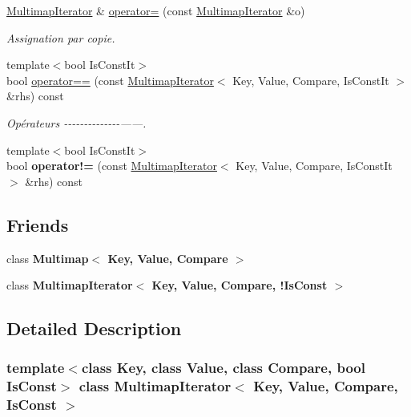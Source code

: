 \begin{DoxyCompactItemize}
\hyperlink{classMultimapIterator}{Multimap\+Iterator} \& \hyperlink{classMultimapIterator_af337db177c534cb9b9ffed2f43880e6a}{operator=} (const \hyperlink{classMultimapIterator}{Multimap\+Iterator} \&o)
\begin{DoxyCompactList}\small\item\em Assignation par copie. \end{DoxyCompactList}\item 
{\footnotesize template$<$bool Is\+Const\+It$>$ }\\bool \hyperlink{classMultimapIterator_ad8ae7f78f86f880a611c9bc4939ec98b}{operator==} (const \hyperlink{classMultimapIterator}{Multimap\+Iterator}$<$ Key, Value, Compare, Is\+Const\+It $>$ \&rhs) const
\begin{DoxyCompactList}\small\item\em Opérateurs -\/-\/-\/-\/-\/-\/-\/-\/-\/-\/-\/-\/-\/-\/------. \end{DoxyCompactList}\item 
\mbox{\label{classMultimapIterator_a22772d2fe41f4cd132c2a882372473e3}} 
{\footnotesize template$<$bool Is\+Const\+It$>$ }\\bool {\bfseries operator!=} (const \hyperlink{classMultimapIterator}{Multimap\+Iterator}$<$ Key, Value, Compare, Is\+Const\+It $>$ \&rhs) const
\end{DoxyCompactItemize}
\subsection*{Friends}
\begin{DoxyCompactItemize}
\item 
\mbox{\label{classMultimapIterator_a6285b24f1f2750aac18f3ca3f8e1ff46}} 
class {\bfseries Multimap$<$ Key, Value, Compare $>$}
\item 
\mbox{\label{classMultimapIterator_a55b0482e033ddf2d5827503cf697da34}} 
class {\bfseries Multimap\+Iterator$<$ Key, Value, Compare, !\+Is\+Const $>$}
\end{DoxyCompactItemize}


\subsection{Detailed Description}
\subsubsection*{template$<$class Key, class Value, class Compare, bool Is\+Const$>$\newline
class Multimap\+Iterator$<$ Key, Value, Compare, Is\+Const $>$}

